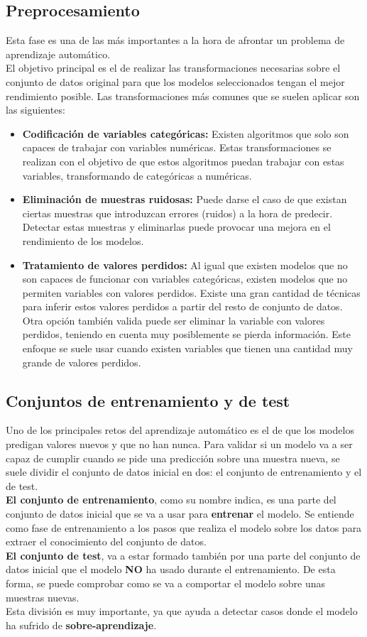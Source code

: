 \subsection{Preprocesamiento}
Esta fase es una de las más importantes a la hora de afrontar un problema de aprendizaje automático.\\
El objetivo principal es el de realizar las transformaciones necesarias sobre el conjunto de datos original para que los modelos seleccionados tengan el mejor rendimiento posible. Las transformaciones más comunes que se suelen aplicar son las siguientes:
\begin{itemize}
	\item \textbf{Codificación de variables categóricas:} Existen algoritmos que solo son capaces de trabajar con variables numéricas. Estas transformaciones se realizan con el objetivo de que estos algoritmos puedan trabajar con estas variables, transformando de categóricas a numéricas.
	\item \textbf{Eliminación de muestras ruidosas:} Puede darse el caso de que existan ciertas muestras que introduzcan errores (ruidos) a la hora de predecir. Detectar estas muestras y eliminarlas puede provocar una mejora en el rendimiento de los modelos.
	\item \textbf{Tratamiento de valores perdidos:} Al igual que existen modelos que no son capaces de funcionar con variables categóricas, existen modelos que no permiten variables con valores perdidos. Existe una gran cantidad de técnicas para inferir estos valores perdidos a partir del resto de conjunto de datos. Otra opción también valida puede ser eliminar la variable con valores perdidos, teniendo en cuenta muy posiblemente se pierda información. Este enfoque se suele usar cuando existen variables que tienen una cantidad muy grande de valores perdidos.
\end{itemize}
\subsection{Conjuntos de entrenamiento y de test}
Uno de los principales retos del aprendizaje automático es el de que los modelos predigan valores nuevos y que no han  nunca. Para validar si un modelo va a ser capaz de cumplir cuando se pide una predicción sobre una muestra nueva, se suele dividir el conjunto de datos inicial en dos: el conjunto de entrenamiento y el de test.\\
\textbf{El conjunto de entrenamiento}, como su nombre indica, es una parte del conjunto de datos inicial que se va a usar para \textbf{entrenar} el modelo. Se entiende como fase de entrenamiento a los pasos que realiza el modelo sobre los datos para extraer el conocimiento del conjunto de datos.\\
\textbf{El conjunto de test}, va a estar formado también por una parte del conjunto de datos inicial que el modelo \textbf{NO} ha usado durante el entrenamiento. De esta forma, se puede comprobar como se va a comportar el modelo sobre unas muestras nuevas.\\
\linebreak
Esta división es muy importante, ya que ayuda a detectar casos donde el modelo ha sufrido de \textbf{sobre-aprendizaje}. 
